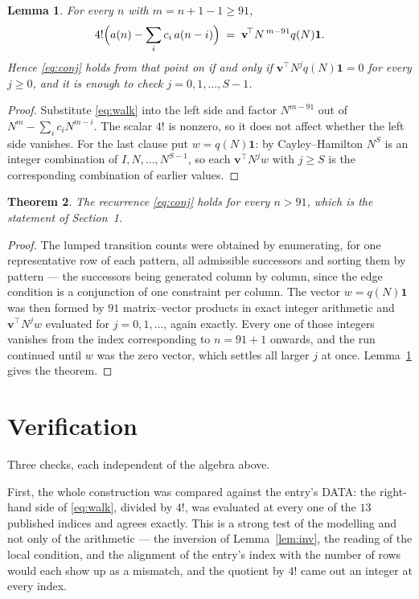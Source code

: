 \documentclass[11pt,a4paper]{article}
\theoremstyle{plain}
\newtheorem{theorem}{Theorem}
\newtheorem{lemma}[theorem]{Lemma}
\theoremstyle{definition}
\begin{document}
\begin{lemma}\label{lem:crit}
For every $n$ with $m=n+1-1\ge91$,
\[
4!\Bigl(a(n)-\sum_i c_i\,a(n-i)\Bigr)\;=\;\mathbf{v}^{\!\top}N^{\,m-91}q(N)\mathbf{1} .
\]
Hence \eqref{eq:conj} holds from that point on if and only if
$\mathbf{v}^{\!\top}N^{j}q(N)\mathbf{1}=0$ for every $j\ge0$, and it is enough to check
$j=0,1,\dots,S-1$.
\end{lemma}

\begin{proof}
Substitute \eqref{eq:walk} into the left side and factor $N^{m-91}$ out of
$N^{m}-\sum_i c_iN^{m-i}$. The scalar $4!$ is nonzero, so it does not affect whether
the left side vanishes. For the last clause put $w=q(N)\mathbf{1}$: by Cayley--Hamilton
$N^{S}$ is an integer combination of $I,N,\dots,N^{S-1}$, so each
$\mathbf{v}^{\!\top}N^{j}w$ with $j\ge S$ is the corresponding combination of earlier
values.
\end{proof}

\begin{theorem}
The recurrence \eqref{eq:conj} holds for every $n>91$, which is the statement of
Section~1.
\end{theorem}

\begin{proof}
The lumped transition counts were obtained by enumerating, for one representative row of
each pattern, all admissible successors and sorting them by pattern --- the successors being
generated column by column, since the edge condition is a conjunction of one constraint per
column. The vector $w=q(N)\mathbf{1}$ was then formed by $91$ matrix--vector products
in exact integer arithmetic and $\mathbf{v}^{\!\top}N^{j}w$ evaluated for
$j=0,1,\dots$, again exactly. Every one of those integers vanishes from the index
corresponding to $n=91+1$ onwards, and the run continued until $w$ was the zero vector,
which settles all larger $j$ at once. Lemma~\ref{lem:crit} gives the theorem.
\end{proof}

\section{Verification}

Three checks, each independent of the algebra above.

First, the whole construction was compared against the entry's DATA: the right-hand side of
\eqref{eq:walk}, divided by $4!$, was evaluated at every one of the $13$
published indices and agrees exactly. This is a strong test of the modelling and not only of
the arithmetic --- the inversion of Lemma~\ref{lem:inv}, the reading of the local
condition, and the alignment of the entry's index with the number of rows would each
show up as a mismatch, and the quotient by $4!$ came out an integer at every index.
\end{document}
